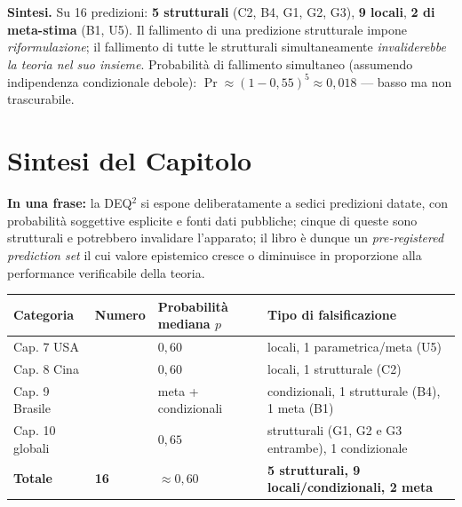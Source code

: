 \Proved{} \textbf{Sintesi.} Su 16 predizioni: \textbf{5 strutturali}
(C2, B4, G1, G2, G3), \textbf{9 locali}, \textbf{2 di meta-stima} (B1,
U5). Il fallimento di una predizione strutturale impone
\emph{riformulazione}; il fallimento di tutte le strutturali
simultaneamente \emph{invaliderebbe la teoria nel suo insieme}.
Probabilità di fallimento simultaneo (assumendo indipendenza
condizionale debole): \(\Pr \approx (1-0{,}55)^5 \approx 0{,}018\) ---
basso ma non trascurabile.



\section{Sintesi del Capitolo}\label{sintesi-del-capitolo}

\Proved{} \textbf{In una frase:} la DEQ$^2$ si espone deliberatamente a
sedici predizioni datate, con probabilità soggettive esplicite e fonti
dati pubbliche; cinque di queste sono strutturali e potrebbero
invalidare l'apparato; il libro è dunque un \emph{pre-registered
prediction set} il cui valore epistemico cresce o diminuisce in
proporzione alla performance verificabile della teoria.

{\def\LTcaptype{none} %
{\small\begin{longtable}[]{@{}
  >{\raggedright\arraybackslash}p{}
  >{\raggedright\arraybackslash}p{}
  >{\raggedright\arraybackslash}p{}
  >{\raggedright\arraybackslash}p{}@{}}
\toprule\noalign{}
\begin{minipage}[b]{\linewidth}\raggedright
Categoria
\end{minipage} & \begin{minipage}[b]{\linewidth}\raggedright
Numero
\end{minipage} & \begin{minipage}[b]{\linewidth}\raggedright
Probabilità mediana \(p\)
\end{minipage} & \begin{minipage}[b]{\linewidth}\raggedright
Tipo di falsificazione
\end{minipage} \\
\midrule\noalign{}
\endhead
\bottomrule\noalign{}
\endlastfoot
Cap. 7 USA & 5 & \(0{,}60\) & 4 locali, 1 parametrica/meta (U5) \\
Cap. 8 Cina & 4 & \(0{,}60\) & 3 locali, 1 strutturale (C2) \\
Cap. 9 Brasile & 4 & meta + condizionali & 2 condizionali, 1 strutturale
(B4), 1 meta (B1) \\
Cap. 10 globali & 3 & \(0{,}65\) & 2 strutturali (G1, G2 e G3 entrambe),
1 condizionale \\
\textbf{Totale} & \textbf{16} & \(\approx 0{,}60\) & \textbf{5
strutturali, 9 locali/condizionali, 2 meta} \\
\end{longtable}}
}

